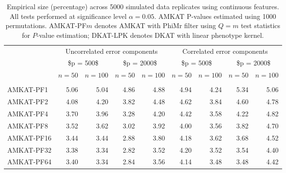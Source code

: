 \documentclass[a4paper,oneside,10pt]{article}\usepackage[]{graphicx}\usepackage[]{color}
\newenvironment{knitrout}{}{} %
\begin{document}
\begin{knitrout}
\color{fgcolor}\begin{table}

\caption{\label{tab:size_cts}Empirical size (percentage) across 5000 simulated data replicates  using continuous features. All tests performed at significance level $\alpha = 0.05$. AMKAT P-values estimated using 1000 permutations. AMKAT-PF$m$ denotes AMKAT with PhiMr filter using $Q=m$ test statistics for $P$-value estimation; DKAT-LPK denotes DKAT with linear phenotype kernel.}
\centering
\begin{tabular}[t]{lrrrrrrrr}
\toprule
\multicolumn{1}{c}{ } & \multicolumn{4}{c}{Uncorrelated error components} & \multicolumn{4}{c}{Correlated error components} \\
\cmidrule(l{3pt}r{3pt}){2-5} \cmidrule(l{3pt}r{3pt}){6-9}
\multicolumn{1}{c}{ } & \multicolumn{2}{c}{\$p = 500\$} & \multicolumn{2}{c}{\$p = 2000\$} & \multicolumn{2}{c}{\$p = 500\$} & \multicolumn{2}{c}{\$p = 2000\$} \\
\cmidrule(l{3pt}r{3pt}){2-3} \cmidrule(l{3pt}r{3pt}){4-5} \cmidrule(l{3pt}r{3pt}){6-7} \cmidrule(l{3pt}r{3pt}){8-9}
  & $n = 50$ & $n = 100$ & $n = 50$ & $n = 100$ & $n = 50$ & $n = 100$ & $n = 50$ & $n = 100$\\
\midrule
\addlinespace[0.3em]
\multicolumn{9}{l}{\textbf{Multivariate normal errors}}\\
\hspace{1em}AMKAT-PF1 & 5.06 & 5.04 & 4.86 & 4.88 & 4.94 & 4.24 & 5.34 & 5.06\\
\hspace{1em}AMKAT-PF2 & 4.08 & 4.20 & 3.82 & 4.48 & 4.62 & 3.84 & 4.60 & 4.78\\
\hspace{1em}AMKAT-PF4 & 3.70 & 3.96 & 3.28 & 4.20 & 4.42 & 3.58 & 4.22 & 4.82\\
\hspace{1em}AMKAT-PF8 & 3.52 & 3.62 & 3.02 & 3.92 & 4.00 & 3.56 & 3.82 & 4.70\\
\hspace{1em}AMKAT-PF16 & 3.44 & 3.44 & 2.88 & 3.80 & 4.18 & 3.62 & 3.68 & 4.52\\
\hspace{1em}AMKAT-PF32 & 3.38 & 3.34 & 2.82 & 3.52 & 4.20 & 3.52 & 3.54 & 4.40\\
\hspace{1em}AMKAT-PF64 & 3.40 & 3.34 & 2.84 & 3.56 & 4.14 & 3.48 & 3.48 & 4.42\\

\end{tabular}
\end{table}
\end{knitrout}
\end{document}

